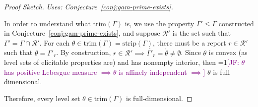 \documentclass[12pt]{article}
\newcommand{\Comments}{1}
\newcommand{\mynote}[2]{\ifnum\Comments=1\textcolor{#1}{#2}\fi}
\newcommand{\jessie}[1]{\mynote{purple}{[JF: #1]}}
\newcommand{\R}{\mathcal{R}}
\newcommand{\inter}[1]{\mathring{#1}}%
\newcommand{\trim}{\mathrm{trim}}
\newcommand{\strip}{\mathrm{strip}}
\begin{document}
\begin{proof}[Proof Sketch]
	\emph{Uses: Conjecture~\ref{conj:gam-prime-exists}.}
	
	In order to understand what $\trim(\Gamma)$ is, we use the property $\Gamma' \leq \Gamma$ constructed in Conjecture~\ref{conj:gam-prime-exists}, and suppose $\R'$ is the set such that $\Gamma' = \Gamma\cap \R'$.
	For each $\theta \in \trim(\Gamma) = \strip(\Gamma)$, there must be a report $r \in \R'$ such that $\theta = \Gamma'_r$.
	By construction, $r \in \R' \implies \inter{\Gamma'_r} = \inter{\theta} \neq \emptyset$.
	Since $\theta$ is convex (as level sets of elicitable properties are) and has nonempty interior, then \jessie{$\theta$ has positive Lebesgue measure $\implies \theta$ is affinely independent $\implies$} $\theta$ is full dimensional. 
	
	Therefore, every level set $\theta \in \trim(\Gamma)$ is full-dimensional.
	

\end{proof}
\end{document}
